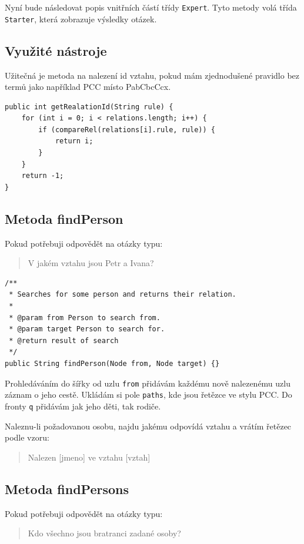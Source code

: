 \documentclass[a4paper, 12pt]{article}
\begin{document}
Nyní bude následovat popis vnitřních částí třídy \texttt{Expert}.
Tyto metody volá třída \texttt{Starter}, která zobrazuje výsledky otázek.

\subsection{Využité nástroje}
Užitečná je metoda na nalezení id vztahu, pokud mám zjednodušené
pravidlo bez termů jako například PCC místo PabCbcCcx.

\begin{verbatim}
public int getRealationId(String rule) {
    for (int i = 0; i < relations.length; i++) {
        if (compareRel(relations[i].rule, rule)) {
            return i;
        }
    }
    return -1;
}
\end{verbatim}

\subsection{Metoda findPerson}
Pokud potřebuji odpovědět na otázky typu:

\begin{quote}
V jakém vztahu jsou Petr a Ivana?
\end{quote}

\begin{verbatim}
/**
 * Searches for some person and returns their relation.
 * 
 * @param from Person to search from.
 * @param target Person to search for.
 * @return result of search
 */
public String findPerson(Node from, Node target) {}
\end{verbatim}

Prohledáváním do šířky od uzlu \texttt{from} přidávám každému
nově nalezenému uzlu záznam o jeho cestě. Ukládám si pole
\texttt{paths}, kde jsou řetězce ve stylu PCC. Do fronty \texttt{q}
přidávám jak jeho děti, tak rodiče.

Naleznu-li požadovanou osobu, najdu jakému odpovídá vztahu
a vrátím řetězec podle vzoru:

\begin{quote}
Nalezen  [jmeno] ve vztahu [vztah]
\end{quote}

\subsection{Metoda findPersons}
Pokud potřebuji odpovědět na otázky typu:

\begin{quote}
Kdo všechno jsou bratranci zadané osoby?
\end{quote}
\end{document}
